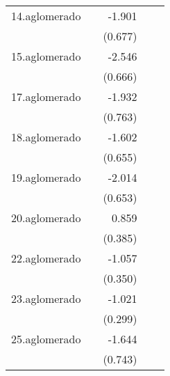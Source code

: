 {\begin{longtable}{l*{4}{D{.}{.}{-1}}}
\addlinespace
14.aglomerado&                     &      -1.901\sym{**} &                     &                     \\
            &                     &     (0.677)         &                     &                     \\
\addlinespace
15.aglomerado&                     &      -2.546\sym{***}&                     &                     \\
            &                     &     (0.666)         &                     &                     \\
\addlinespace
17.aglomerado&                     &      -1.932\sym{*}  &                     &                     \\
            &                     &     (0.763)         &                     &                     \\
\addlinespace
18.aglomerado&                     &      -1.602\sym{*}  &                     &                     \\
            &                     &     (0.655)         &                     &                     \\
\addlinespace
19.aglomerado&                     &      -2.014\sym{**} &                     &                     \\
            &                     &     (0.653)         &                     &                     \\
\addlinespace
20.aglomerado&                     &       0.859\sym{*}  &                     &                     \\
            &                     &     (0.385)         &                     &                     \\
\addlinespace
22.aglomerado&                     &      -1.057\sym{**} &                     &                     \\
            &                     &     (0.350)         &                     &                     \\
\addlinespace
23.aglomerado&                     &      -1.021\sym{***}&                     &                     \\
            &                     &     (0.299)         &                     &                     \\
\addlinespace
25.aglomerado&                     &      -1.644\sym{*}  &                     &                     \\
            &                     &     (0.743)         &                     &                     \\

\end{longtable}}
